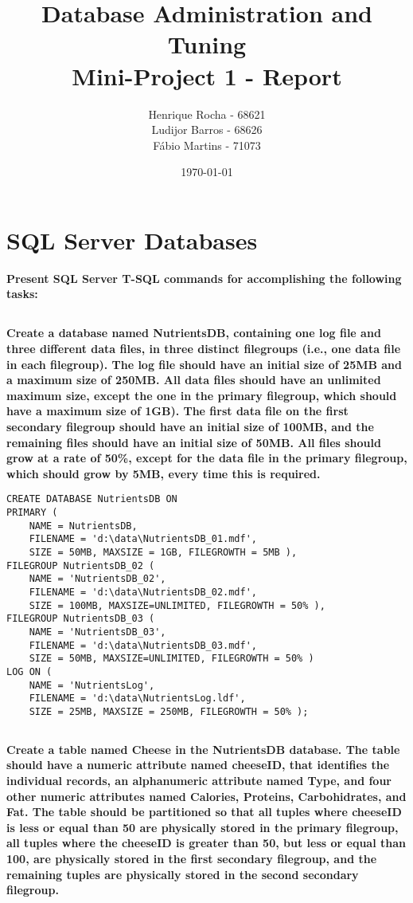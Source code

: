\documentclass[11pt,report]{article}
\title{	Database Administration and Tuning \\ Mini-Project 1 - Report}
\author{
	Henrique Rocha - 68621 \\
	Ludijor Barros - 68626 \\
	Fábio Martins - 71073
}
\date{\today}
\begin{document}
	\maketitle
\section{SQL Server Databases}
	\textbf{Present SQL Server T-SQL commands for accomplishing the following tasks:}
	\subsection{}
	\textbf{Create a database named NutrientsDB, containing one log file and three different data files, in three distinct filegroups (i.e., one data file in each filegroup). The log file should have an initial size of 25MB and a maximum size of 250MB. All data files should have an unlimited maximum size, except the one in the primary filegroup, which should have a maximum size of 1GB). The first data file on the first secondary filegroup should have an initial size of 100MB, and the remaining files should have an initial size of 50MB. All files should grow at a rate of 50\%, except for the data file in the primary filegroup, which should grow by 5MB, every time this is required.}

\begin{lstlisting}
CREATE DATABASE NutrientsDB ON 
PRIMARY (
	NAME = NutrientsDB,
	FILENAME = 'd:\data\NutrientsDB_01.mdf',
	SIZE = 50MB, MAXSIZE = 1GB, FILEGROWTH = 5MB ),
FILEGROUP NutrientsDB_02 (
	NAME = 'NutrientsDB_02', 
	FILENAME = 'd:\data\NutrientsDB_02.mdf', 
	SIZE = 100MB, MAXSIZE=UNLIMITED, FILEGROWTH = 50% ),
FILEGROUP NutrientsDB_03 (
	NAME = 'NutrientsDB_03', 
	FILENAME = 'd:\data\NutrientsDB_03.mdf', 
	SIZE = 50MB, MAXSIZE=UNLIMITED, FILEGROWTH = 50% )
LOG ON (
	NAME = 'NutrientsLog',
	FILENAME = 'd:\data\NutrientsLog.ldf',
	SIZE = 25MB, MAXSIZE = 250MB, FILEGROWTH = 50% );
\end{lstlisting}

	\subsection{}
	\textbf{Create a table named Cheese in the NutrientsDB database. The table should have a numeric attribute named cheeseID, that identifies the individual records, an alphanumeric attribute named Type, and four other numeric attributes named Calories, Proteins, Carbohidrates, and Fat. The table should be partitioned so that all tuples where cheeseID is less or equal than 50 are physically stored in the primary filegroup, all tuples where the cheeseID is greater than 50, but less or equal than 100, are physically stored in the first secondary filegroup, and the remaining tuples are physically stored in the second secondary filegroup.}
\end{document}
